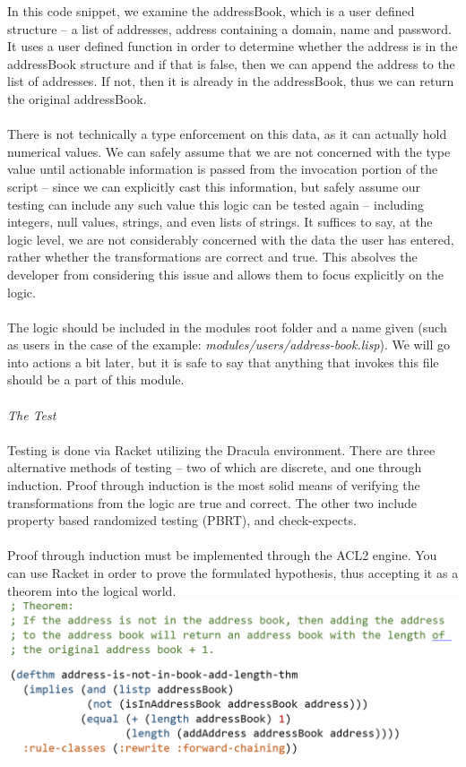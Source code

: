 \documentclass[11pt, letterpaper]{report}
\begin{document}
\begin{description}
In this code snippet, we examine the addressBook, which is a user defined structure – a list of addresses, address containing a domain, name and password.  It uses a user defined function in order to determine whether the address is in the addressBook structure and if that is false, then we can append the address to the list of addresses.  If not, then it is already in the addressBook, thus we can return the original addressBook.  \\\\
There is not technically a type enforcement on this data, as it can actually hold numerical values.  We can safely assume that we are not concerned with the type value until actionable information is passed from the invocation portion of the script – since we can explicitly cast this information, but safely assume our testing can include any such value this logic can be tested again – including integers, null values, strings, and even lists of strings.  It suffices to say, at the logic level, we are not considerably concerned with the data the user has entered, rather whether the transformations are correct and true.  This absolves the developer from considering this issue and allows them to focus explicitly on the logic.\\\\
The logic should be included in the modules root folder and a name given (such as users in the case of the example: \textit{modules/users/address-book.lisp}).  We will go into actions a bit later, but it is safe to say that anything that invokes this file should be a part of this module. \\ \\
\textit{The Test} \\ \\
Testing is done via Racket utilizing the Dracula environment.  There are three alternative methods of testing – two of which are discrete, and one through induction.  Proof through induction is the most solid means of verifying the transformations from the logic are true and correct.  The other two include property based randomized testing (PBRT), and check-expects.\\\\

Proof through induction must be implemented through the ACL2 engine.  You can use Racket in order to prove the formulated hypothesis, thus accepting it as a theorem into the logical world.\\

\includegraphics[scale=.3]{svrthm}\\


\end{description}
\end{document}
